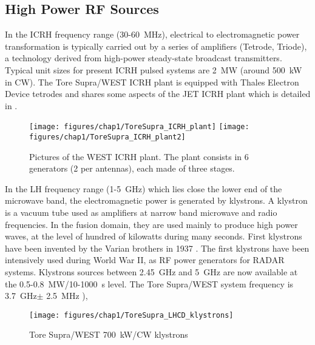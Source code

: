 \subsection{High Power RF Sources}


In the ICRH frequency range (30-60~\si{MHz}), electrical to electromagnetic power transformation is typically carried out by a series of amplifiers (Tetrode, Triode), a technology derived from high-power steady-state broadcast transmitters. Typical unit sizes for present ICRH pulsed systems are 2~\si{MW} (around 500~\si{kW} in CW). The Tore Supra/WEST ICRH plant is equipped with Thales Electron Device tetrodes and shares some aspects of the JET ICRH plant which is detailed in .

\begin{figure}[h]
	\centering
	\texttt{[image: figures/chap1/ToreSupra\_ICRH\_plant]}
	\texttt{[image: figures/chap1/ToreSupra\_ICRH\_plant2]}
	\caption{Pictures of the WEST ICRH plant. The plant consists in 6 generators (2 per antennas), each made of three stages.}
	\label{fig:toresupraicrhplant}
\end{figure}

In the LH frequency range (1-5~\si{GHz}) which lies close the lower end of the microwave band, the electromagnetic power is generated by klystrons. A klystron is a vacuum tube used as amplifiers at narrow band microwave and radio frequencies. In the fusion domain, they are used mainly to produce high power waves, at the level of hundred of kilowatts during many seconds. First klystrons have been invented by the Varian brothers in 1937 . The first klystrons have been intensively used during World War II, as RF power generators for RADAR systems. Klystrons sources between 2.45~\si{GHz} and 5~\si{GHz} are now available at the 0.5-0.8~\si{MW}/10-1000~\si{s} level. The Tore Supra/WEST system frequency is 3.7~\si{GHz}$\pm$ 2.5~\si{MHz} ),

\begin{figure}[h]
	\centering
	\texttt{[image: figures/chap1/ToreSupra\_LHCD\_klystrons]}
	\caption{Tore Supra/WEST 700~kW/CW klystrons}
	\label{fig:toresupralhcdklystrons}
\end{figure}


